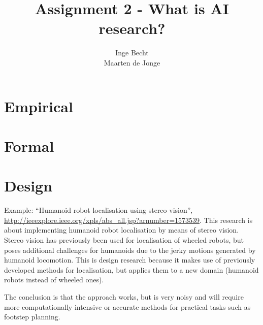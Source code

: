 \documentclass[a4paper, 12pt]{article}
\author{Inge Becht \\ Maarten de Jonge}
\title{Assignment 2 - What is AI research?}
\begin{document}
\maketitle

\section{Empirical}

\section{Formal}

\section{Design}
Example: ``Humanoid robot localisation using stereo vision'',
\url{http://ieeexplore.ieee.org/xpls/abs\_all.jsp?arnumber=1573539}.
This research is about implementing humanoid robot localisation by means of
stereo vision. Stereo vision has previously been used for localisation of
wheeled robots, but poses additional challenges for humanoids due to the jerky
motions generated by humanoid locomotion.
This is design research because it makes use of previously developed methods for
localisation, but applies them to a new domain (humanoid robots instead of
wheeled ones).

The conclusion is that the approach works, but is very noisy and will require
more computationally intensive or accurate methods for practical tasks such as
footstep planning.
	
\end{document}
